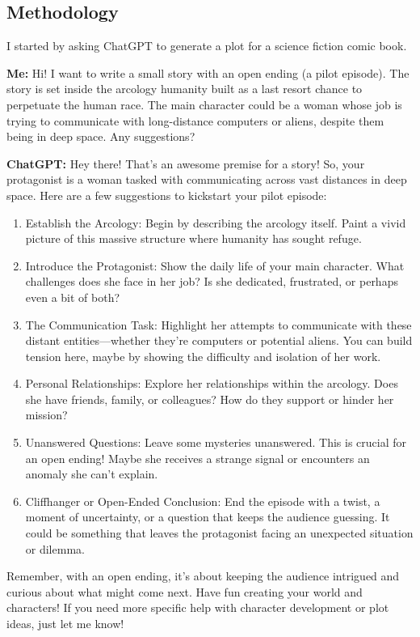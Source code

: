 \documentclass[a4paper,11pt]{article}
\newenvironment{shadedquotation1}
    {\colorlet{shadecolor}{JungleGreen!15}\begin{shaded*}
    \quoting[leftmargin=1cm, rightmargin=1cm, vskip=0pt]
    }
    {\endquoting
    \end{shaded*}
}
\begin{document}
\subsection*{Methodology} 
I started by asking ChatGPT to generate a plot for a science fiction comic book. 
\begin{shadedquotation1}
    \textbf{Me:} Hi! I want to write a small story with an open ending (a pilot episode). The story is set inside the arcology humanity built as a last resort chance to perpetuate the human race. The main character could be a woman whose job is trying to communicate with long-distance computers or aliens, despite them being in deep space. Any suggestions?\medskip

    \textbf{ChatGPT:} Hey there! That's an awesome premise for a story! So, your protagonist is a woman tasked with communicating across vast distances in deep space. Here are a few suggestions to kickstart your pilot episode:
    \begin{enumerate}
        \item Establish the Arcology: Begin by describing the arcology itself. Paint a vivid picture of this massive structure where humanity has sought refuge.
        \item Introduce the Protagonist: Show the daily life of your main character. What challenges does she face in her job? Is she dedicated, frustrated, or perhaps even a bit of both?
        \item The Communication Task: Highlight her attempts to communicate with these distant entities—whether they're computers or potential aliens. You can build tension here, maybe by showing the difficulty and isolation of her work.
        \item Personal Relationships: Explore her relationships within the arcology. Does she have friends, family, or colleagues? How do they support or hinder her mission?
        \item Unanswered Questions: Leave some mysteries unanswered. This is crucial for an open ending! Maybe she receives a strange signal or encounters an anomaly she can't explain.
        \item Cliffhanger or Open-Ended Conclusion: End the episode with a twist, a moment of uncertainty, or a question that keeps the audience guessing. It could be something that leaves the protagonist facing an unexpected situation or dilemma.
    \end{enumerate}
    Remember, with an open ending, it's about keeping the audience intrigued and curious about what might come next. Have fun creating your world and characters! If you need more specific help with character development or plot ideas, just let me know!
\end{shadedquotation1}
\end{document}
